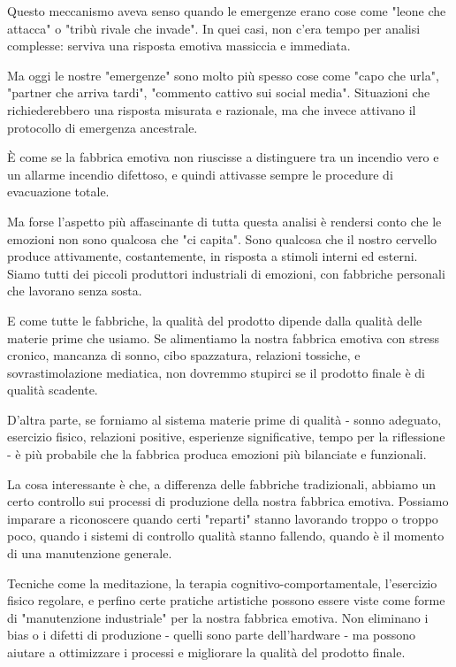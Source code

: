 Questo meccanismo aveva senso quando le emergenze erano cose come "leone che attacca" o "tribù rivale che invade". In quei casi, non c'era tempo per analisi complesse: serviva una risposta emotiva massiccia e immediata.

Ma oggi le nostre "emergenze" sono molto più spesso cose come "capo che urla", "partner che arriva tardi", "commento cattivo sui social media". Situazioni che richiederebbero una risposta misurata e razionale, ma che invece attivano il protocollo di emergenza ancestrale.

È come se la fabbrica emotiva non riuscisse a distinguere tra un incendio vero e un allarme incendio difettoso, e quindi attivasse sempre le procedure di evacuazione totale.

\bigskip

Ma forse l'aspetto più affascinante di tutta questa analisi è rendersi conto che le emozioni non sono qualcosa che "ci capita". Sono qualcosa che il nostro cervello produce attivamente, costantemente, in risposta a stimoli interni ed esterni. Siamo tutti dei piccoli produttori industriali di emozioni, con fabbriche personali che lavorano senza sosta.

E come tutte le fabbriche, la qualità del prodotto dipende dalla qualità delle materie prime che usiamo. Se alimentiamo la nostra fabbrica emotiva con stress cronico, mancanza di sonno, cibo spazzatura, relazioni tossiche, e sovrastimolazione mediatica, non dovremmo stupirci se il prodotto finale è di qualità scadente.

D'altra parte, se forniamo al sistema materie prime di qualità - sonno adeguato, esercizio fisico, relazioni positive, esperienze significative, tempo per la riflessione - è più probabile che la fabbrica produca emozioni più bilanciate e funzionali.

La cosa interessante è che, a differenza delle fabbriche tradizionali, abbiamo un certo controllo sui processi di produzione della nostra fabbrica emotiva. Possiamo imparare a riconoscere quando certi "reparti" stanno lavorando troppo o troppo poco, quando i sistemi di controllo qualità stanno fallendo, quando è il momento di una manutenzione generale.

\medskip

Tecniche come la meditazione, la terapia cognitivo-comportamentale, l'esercizio fisico regolare, e perfino certe pratiche artistiche possono essere viste come forme di "manutenzione industriale" per la nostra fabbrica emotiva. Non eliminano i bias o i difetti di produzione - quelli sono parte dell'hardware - ma possono aiutare a ottimizzare i processi e migliorare la qualità del prodotto finale.

